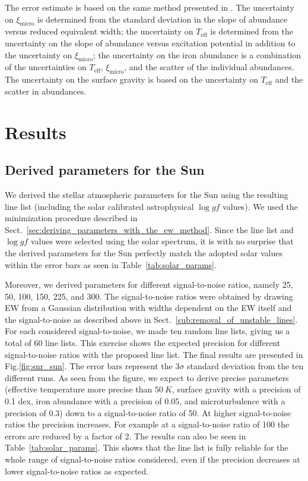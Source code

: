 \documentclass{aa}
\begin{document}
The error estimate is based on the same method presented in
\citet{Gonzalez1998}. The uncertainty on $\xi_\mathrm{micro}$ is
determined from the standard deviation in the slope of abundance
versus reduced equivalent width; the uncertainty on $T_\mathrm{eff}$
is determined from the uncertainty on the slope of abundance
versus excitation potential in addition to the uncertainty on
$\xi_\mathrm{micro}$; the uncertainty on the iron abundance
is a combination of the uncertainties on $T_\mathrm{eff}$,
$\xi_\mathrm{micro}$, and the scatter of the individual 
abundances. The uncertainty on the surface gravity is based on the
uncertainty on $T_\mathrm{eff}$ and the scatter in 
abundances.


\section{Results}
\label{sec:results}

\subsection{Derived parameters for the Sun}
\label{sec:derived_parameters_of_the_sun}

We derived the stellar atmospheric parameters for the Sun using the
resulting line list (including the solar calibrated astrophysical $\log
\mathit{gf}$ values). We used the minimization procedure described in
Sect.~\ref{sec:deriving_parameters_with_the_ew_method}. Since the line
list and $\log\mathit{gf}$ values were selected using the solar
spectrum, it is with no surprise that the derived parameters for the Sun
perfectly match the adopted solar values within the error bars as seen
in Table~\ref{tab:solar_params}.

Moreover, we derived parameters for different signal-to-noise ratios,
namely 25, 50, 100, 150, 225, and 300. The signal-to-noise ratios
were obtained by drawing EW from a Gaussian distribution with widths
dependent on the EW itself and the signal-to-noise as described above
in Sect.~\ref{sub:removal_of_unstable_lines}. For each considered
signal-to-noise, we made ten random line lists, giving us a total of 60
line lists. This exercise shows the expected precision for different
signal-to-noise ratios with the proposed line list. The final results
are presented in Fig.\ref{fig:snr_sun}. The error bars represent the
$3\sigma$ standard deviation from the ten different runs. As seen
from the figure, we expect to derive precise parameters (effective
temperature more precise than $\SI{50}{K}$, surface gravity with a
precision of 0.1 dex, iron abundance with a precision of 0.05, and
microturbulence with a precision of 0.3) down to a signal-to-noise ratio
of 50. At higher signal-to-noise ratios the precision increases. For example
at a signal-to-noise ratio of 100 the errors are reduced by a factor
of 2. The results can also be seen in Table~\ref{tab:solar_params}.
This shows that the line list is fully reliable for the whole range of
signal-to-noise ratios considered, even if the precision decreases at
lower signal-to-noise ratios as expected.
\end{document}
